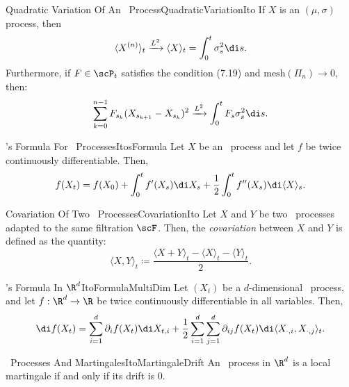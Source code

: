 \begin{thm}{Quadratic Variation Of An \Ito\ Process}{QuadraticVariationIto}
	If $X$ is an \Ito$(\mu, \sigma)$ process, then
	\begin{equation}
		\langle X^{(n)} \rangle_t \xrightarrow{L^2} \langle X \rangle_t = \int_{0}^{t} \sigma_s^2 \di s.
	\end{equation}
	Furthermore, if $F \in \scP_t$ satisfies the condition (7.19) and $\mathrm{mesh}(\Pi_n) \to 0$, then:
	\begin{equation}
		\sum_{k=0}^{n-1} F_{s_k} (X_{s_{k+1}} - X_{s_k})^2 \xrightarrow{L^2} \int_{0}^{t} F_s \sigma_s^2 \di s.
	\end{equation}
\end{thm}

\begin{thm}{\Ito's Formula For \Ito\ Processes}{ItosFormula}
	Let $X$ be an \Ito\ process and let $f$ be twice continuously differentiable. Then,
	\begin{equation}
		f(X_t) = f(X_0) + \int_{0}^{t} f'(X_s) \di X_s + \frac{1}{2} \int_{0}^{t} f''(X_s) \di \langle X \rangle_s.
		\label{eq:ItoFormula}
	\end{equation}
\end{thm}

\begin{defn}{Covariation Of Two \Ito\ Processes}{CovariationIto}
	Let $X$ and $Y$ be two \Ito\ processes adapted to the same filtration $\scF$. Then, the \textit{covariation} between $X$ and $Y$ is defined as the quantity:
	\begin{equation}
		\langle X, Y \rangle_t \coloneqq \frac{\langle X + Y \rangle_t - \langle X \rangle_t - \langle Y \rangle_t}{2}.
		\label{eq:CovariationDef}
	\end{equation}
\end{defn}

\begin{thm}{\Ito's Formula In $\R^d$}{ItoFormulaMultiDim}
	Let $(X_t)$ be a $d$-dimensional \Ito\ process, and let $f : \R^d \to \R$ be twice continuously differentiable in all variables. Then,
	\begin{equation}
		\di f(X_t) = \sum_{i=1}^{d} \partial_i f(X_t) \di X_{t,i} + \frac{1}{2} \sum_{i=1}^{d} \sum_{j=1}^{d} \partial_{ij} f(X_t) \di \langle X_{\cdot, i}, X_{\cdot, j} \rangle_t.
		\label{eq:DifferentialItoMulti}
	\end{equation}
\end{thm}

\begin{thm}{\Ito\ Processes And Martingales}{ItoMartingaleDrift}
	An \Ito\ process in $\R^d$ is a local martingale if and only if its drift is 0.
\end{thm}

